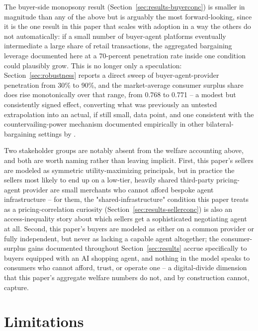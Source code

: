 \documentclass[review]{elsarticle}
\begin{document}
The buyer-side monopsony result (Section~\ref{sec:results-buyerconc}) is smaller in magnitude than any of the above but is arguably the most forward-looking, since it is the one result in this paper that scales with adoption in a way the others do not automatically: if a small number of buyer-agent platforms eventually intermediate a large share of retail transactions, the aggregated bargaining leverage documented here at a 70-percent penetration rate inside one condition could plausibly grow. This is no longer only a speculation: Section~\ref{sec:robustness} reports a direct sweep of buyer-agent-provider penetration from 30\% to 90\%, and the market-average consumer surplus share does rise monotonically over that range, from 0.768 to 0.771 -- a modest but consistently signed effect, converting what was previously an untested extrapolation into an actual, if still small, data point, and one consistent with the countervailing-power mechanism documented empirically in other bilateral-bargaining settings by \citet{chipty1999role}.

Two stakeholder groups are notably absent from the welfare accounting above, and both are worth naming rather than leaving implicit. First, this paper's sellers are modeled as symmetric utility-maximizing principals, but in practice the sellers most likely to end up on a low-tier, heavily shared third-party pricing-agent provider are small merchants who cannot afford bespoke agent infrastructure -- for them, the "shared-infrastructure" condition this paper treats as a pricing-correlation curiosity (Section~\ref{sec:results-sellerconc}) is also an access-inequality story about which sellers get a sophisticated negotiating agent at all. Second, this paper's buyers are modeled as either on a common provider or fully independent, but never as lacking a capable agent altogether; the consumer-surplus gains documented throughout Section~\ref{sec:results} accrue specifically to buyers equipped with an AI shopping agent, and nothing in the model speaks to consumers who cannot afford, trust, or operate one -- a digital-divide dimension that this paper's aggregate welfare numbers do not, and by construction cannot, capture.

\section{Limitations}
\label{sec:limitations}
\end{document}
